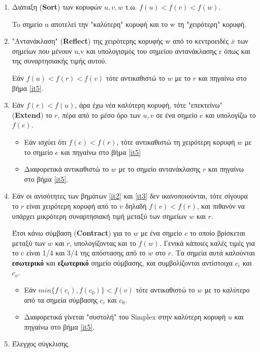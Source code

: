 \documentclass[a4paper,12pt,twoside]{report}
\theoremstyle{plain}
\theoremstyle{definition}
\theoremstyle{remark}
\begin{document}
\begin{enumerate}
\item \label{it1} Διάταξη (\textbf{Sort}) των κορυφών $u,v,w$ τ.ω. $f(u)<f(v)<f(w)$. 

To σημείο u αποτελεί  την "καλύτερη" κορυφή και το w τη "χειρότερη" κορυφή.
\item \label{it2} "Αντανάκλαση" (\textbf{Reflect}) της χειρότερης κορυφής w  από το κεντροειδές $\overline{x}$ των σημείων που μένουν u,v και υπολογισμός του σημείου αντανάκλασης r όπως και της συναρτησιακής τιμής αυτού.

Εάν $f(u)<f(r)<f(v)$ τότε αντικαθιστώ το $w$ με το $r$ και πηγαίνω στο βήμα \ref{it5}.
\item \label{it3} Εάν $f(r)<f(u)$, άρα έχω νέα καλύτερη κορυφή, τότε "επεκτείνω" (\textbf{Εxtend}) το $r$, πέρα από το μέσο όρο των $u,v$ σε ένα σημείο $e$ και υπολογίζω το $f(e)$.
\begin{itemize}
\item  Eάν ισχύει ότι $f(e) < f(r)$, τότε αντικαθιστώ τη χειρότερη κορυφή $w$ με το σημείο $e$ και πηγαίνω στο βήμα \ref{it5}
\item Διαφορετικά αντικαθιστώ το $w$ με το σημείο αντανάκλασης $r$ και πηγαίνω στο βήμα \ref{it5}.
\end{itemize}
\item \label{it4} Εάν οι ανισότητες των βημάτων \ref{it2} και \ref{it3} δεν ικανοποιούνται, τότε σίγουρα το $r$ είναι χειρότερη κορυφή από το $v$ δηλαδή $f(v)<f(r)$, και πιθανόν να υπάρχει μικρότερη συναρτησιακή τιμή μεταξύ των σημείων $w$ και $r$. 

Έτσι κάνω σύμβαση (\textbf{Contract}) για το $w$ με ένα σημείο $c$ το οποίο βρίσκεται μεταξύ των $w$ και $r$, υπολογίζοντας και το $f(w)$. Γενικά κάποιες καλές τιμές για το c είναι 1/4 και 3/4 της απόστασης από το $w$ στο $r$. Τα σημεία αυτά καλούνται \textbf{εσωτερικό} και \textbf{εξωτερικό} σημείο σύμβασης, και συμβολίζονται αντίστοιχα $c_i$ και $c_o$.
\begin{itemize}
\item Eάν $min\{f(c_i),f(c_0)\} < f(v)$ τότε αντικαθιστώ το $w$ με το καλύτερο από τα σημεία σύμβασης $c_i$ και $c_0$.
\item Διαφορετικά γίνεται "συστολή" του Simplex στην καλύτερη κορυφή $u$ και πηγαίνω στο βήμα \ref{it5}.
\end{itemize}
\item \label{it5} Έλεγχος σύγκλισης.


\end{enumerate}
\end{document}
